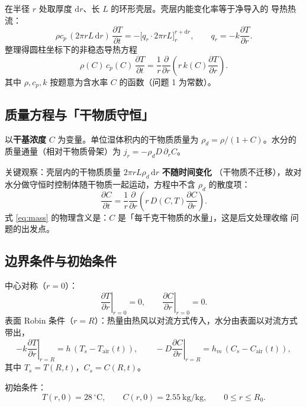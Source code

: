 \documentclass[11pt,a4paper]{article}
\theoremstyle{definition}
\begin{document}
在半径 $r$ 处取厚度 $\mathrm{d}r$、长 $L$ 的环形壳层。壳层内能变化率等于净导入的
导热热流：
\[
\rho c_p\,(2\pi r L\,\mathrm{d}r)\,\frac{\partial T}{\partial t}
=-\Big[q_r\cdot 2\pi rL\Big]_{r}^{r+\mathrm{d}r},
\qquad q_r=-k\frac{\partial T}{\partial r}.
\]
整理得圆柱坐标下的非稳态导热方程
\begin{equation}
\rho(C)\,c_p(C)\,\frac{\partial T}{\partial t}
=\frac{1}{r}\frac{\partial}{\partial r}\!\left(r\,k(C)\frac{\partial T}{\partial r}\right).
\label{eq:energy}
\end{equation}
其中 $\rho,c_p,k$ 按题意为含水率 $C$ 的函数（问题 1 为常数）。

\subsection{质量方程与「干物质守恒」}

以\textbf{干基浓度} $C$ 为变量。单位湿体积内的干物质质量为
$\rho_d=\rho/(1+C)$。水分的质量通量（相对干物质骨架）为
$j_r=-\rho_d D\,\partial_r C$。

关键观察：壳层内的干物质质量 $2\pi rL\rho_d\,\mathrm{d}r$ \textbf{不随时间变化}
（干物质不迁移），故对水分做守恒时控制体随干物质一起运动，方程中不含
$\rho_d$ 的散度项：
\begin{equation}
\frac{\partial C}{\partial t}
=\frac{1}{r}\frac{\partial}{\partial r}\!\left(r\,D(C,T)\frac{\partial C}{\partial r}\right).
\label{eq:mass}
\end{equation}
式 \eqref{eq:mass} 的物理含义是：$C$ 是「每千克干物质的水量」，这是后文处理收缩
问题的出发点。

\subsection{边界条件与初始条件}

中心对称（$r=0$）：
\begin{equation}
\left.\frac{\partial T}{\partial r}\right|_{r=0}=0,
\qquad
\left.\frac{\partial C}{\partial r}\right|_{r=0}=0 .
\label{eq:sym}
\end{equation}
表面 Robin 条件（$r=R$）：热量由热风以对流方式传入，水分由表面以对流方式带出，
\begin{equation}
-k\left.\frac{\partial T}{\partial r}\right|_{r=R}=h\,(T_s-T_{\mathrm{air}}(t)),
\qquad
-D\left.\frac{\partial C}{\partial r}\right|_{r=R}=h_m\,(C_s-C_{\mathrm{air}}(t)),
\label{eq:robin}
\end{equation}
其中 $T_s=T(R,t)$，$C_s=C(R,t)$。

初始条件：
\begin{equation}
T(r,0)=28\,^\circ\mathrm{C},\qquad C(r,0)=2.55\ \mathrm{kg/kg},\qquad 0\le r\le R_0 .
\label{eq:ic}
\end{equation}
\end{document}
